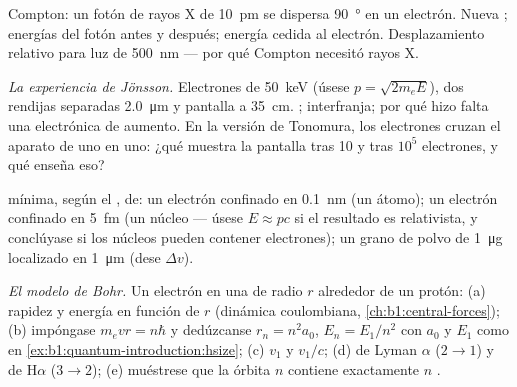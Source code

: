 \begin{exercise}[$\star\star$]\label{exo:b1:quantum-introduction:6}
Compton: un fotón de rayos X de \qty{10}{pm} se dispersa \qty{90}{\degree}
en un electrón. Nueva ; energías del fotón antes y
después; energía cedida al electrón. Desplazamiento relativo para luz de
\qty{500}{nm} --- por qué Compton necesitó rayos X.
\end{exercise}

\begin{exercise}[$\star\star$]\label{exo:b1:quantum-introduction:7}
\emph{La experiencia de Jönsson.} Electrones de \qty{50}{keV} (úsese $p =
\sqrt{2m_eE}$), dos rendijas separadas \qty{2.0}{\micro m} y pantalla a
\qty{35}{cm}. ; interfranja; por qué hizo falta una 
electrónica de aumento. En la versión de Tonomura, los electrones cruzan
el aparato de uno en uno: ¿qué muestra la pantalla tras 10 y tras $10^5$
electrones, y qué enseña eso?
\end{exercise}

\begin{exercise}[$\star\star$]\label{exo:b1:quantum-introduction:8}
 mínima, según el , de: un
electrón confinado en \qty{0.1}{nm} (un átomo); un electrón confinado en
\qty{5}{fm} (un núcleo --- úsese $E \approx pc$ si el resultado es
relativista, y conclúyase si los núcleos pueden contener electrones); un
grano de polvo de \qty{1}{\micro g} localizado en \qty{1}{\micro m} (dese $\Delta v$).
\end{exercise}

\begin{exercise}[$\star\star$]\label{exo:b1:quantum-introduction:9}
\emph{El modelo de Bohr.} Un electrón en una  de radio $r$
alrededor de un protón: (a) rapidez y energía en función de $r$ (dinámica
coulombiana, \cref{ch:b1:central-forces}); (b) impóngase $m_evr = n\hbar$ y
dedúzcanse $r_n = n^2a_0$, $E_n = E_1/n^2$ con $a_0$ y $E_1$ como en
\cref{ex:b1:quantum-introduction:hsize}; (c) $v_1$ y $v_1/c$; (d)
 de Lyman $\alpha$ ($2 \to 1$) y de H$\alpha$ ($3 \to 2$);
(e) muéstrese que la órbita $n$ contiene exactamente $n$ .
\end{exercise}

